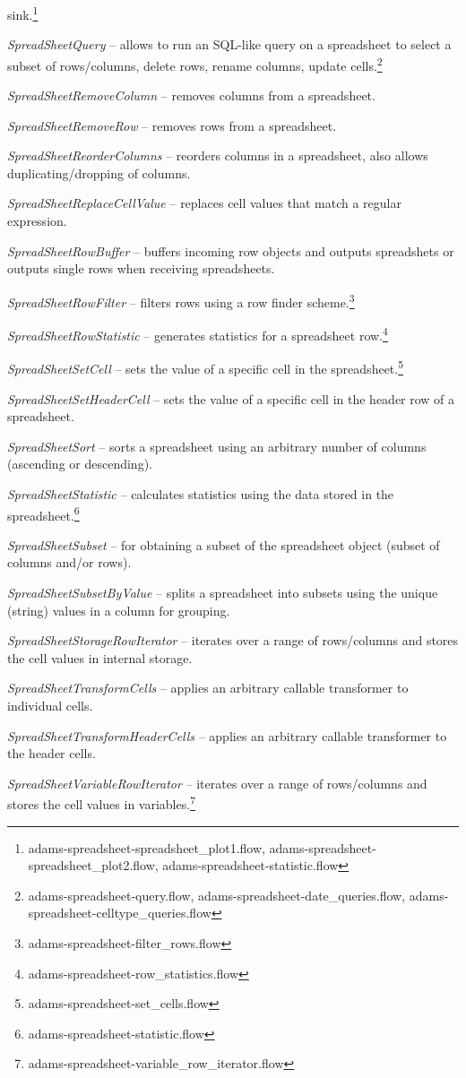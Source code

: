 \documentclass[a4paper]{book}
\begin{document}
\begin{tight_itemize}
	sink.\footnote{adams-spreadsheet-spreadsheet\_plot1.flow, 
	adams-spreadsheet-spreadsheet\_plot2.flow, adams-spreadsheet-statistic.flow}
	\item \textit{SpreadSheetQuery} -- allows to run an SQL-like query on a 
	spreadsheet to select a subset of rows/columns, delete rows, rename columns, 
	update cells.\footnote{adams-spreadsheet-query.flow, adams-spreadsheet-date\_queries.flow, 
	adams-spreadsheet-celltype\_queries.flow}
	\item \textit{SpreadSheetRemoveColumn} -- removes columns from a spreadsheet.
	\item \textit{SpreadSheetRemoveRow} -- removes rows from a spreadsheet.
	\item \textit{SpreadSheetReorderColumns} -- reorders columns in a spreadsheet, 
	also allows duplicating/dropping of columns.
	\item \textit{SpreadSheetReplaceCellValue} -- replaces cell values that
	match a regular expression.
	\item \textit{SpreadSheetRowBuffer} -- buffers incoming row objects and
	outputs spreadshets or outputs single rows when receiving spreadsheets.
	\item \textit{SpreadSheetRowFilter} -- filters rows using a row
	finder scheme.\footnote{adams-spreadsheet-filter\_rows.flow}
	\item \textit{SpreadSheetRowStatistic} -- generates statistics for a 
	spreadsheet row.\footnote{adams-spreadsheet-row\_statistics.flow}
	\item \textit{SpreadSheetSetCell} -- sets the value of a specific cell
	in the spreadsheet.\footnote{adams-spreadsheet-set\_cells.flow}
	\item \textit{SpreadSheetSetHeaderCell} -- sets the value of a specific cell
	in the header row of a spreadsheet.
	\item \textit{SpreadSheetSort} -- sorts a spreadsheet using an arbitrary
	number of columns (ascending or descending).
	\item \textit{SpreadSheetStatistic} -- calculates statistics using the
	data stored in the spreadsheet.\footnote{adams-spreadsheet-statistic.flow}
	\item \textit{SpreadSheetSubset} -- for obtaining a subset of the 
	spreadsheet object (subset of columns and/or rows).
	\item \textit{SpreadSheetSubsetByValue} -- splits a spreadsheet into 
	subsets using the unique (string) values in a column for grouping.
	\item \textit{SpreadSheetStorageRowIterator} -- iterates over a range of 
	rows/columns and stores the cell values in internal storage.
	\item \textit{SpreadSheetTransformCells} -- applies an arbitrary callable
	transformer to individual cells.
	\item \textit{SpreadSheetTransformHeaderCells} -- applies an arbitrary callable
	transformer to the header cells.
	\item \textit{SpreadSheetVariableRowIterator} -- iterates over a range of 
	rows/columns and stores the cell values in 
	variables.\footnote{adams-spreadsheet-variable\_row\_iterator.flow}
\end{tight_itemize}
\end{document}
